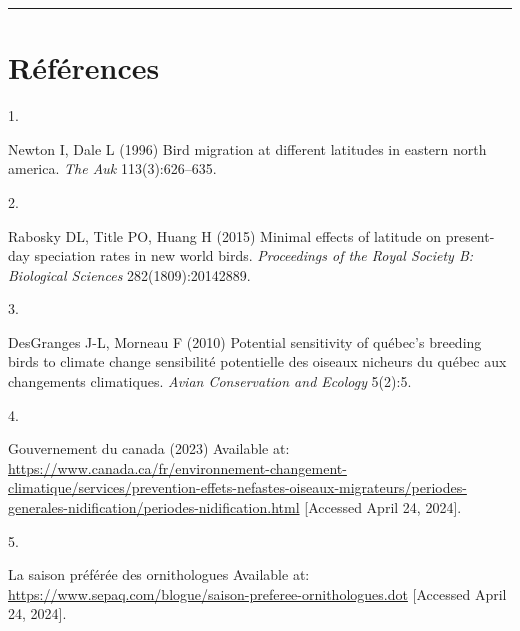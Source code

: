 \documentclass[9pt,twocolumn,twoside,]{pnas-new}
\newlength{\cslhangindent}
\newlength{\csllabelwidth}
\newlength{\cslentryspacingunit} %
\newenvironment{CSLReferences}[2] %
 {%
  \setlength{\parindent}{0pt}
  \ifodd #1
  \let\oldpar\par
  \def\par{\hangindent=\cslhangindent\oldpar}
  \fi
  \setlength{\parskip}{#2\cslentryspacingunit}
 }%
 {}
\newcommand{\CSLLeftMargin}[1]{\parbox[t]{\csllabelwidth}{#1}}
\newcommand{\CSLRightInline}[1]{\parbox[t]{\linewidth - \csllabelwidth}{#1}\break}
\begin{document}
\begin{center}\rule{0.5\linewidth}{0.5pt}\end{center}

\showmatmethods

\hypertarget{references}{%
\section*{Références}\label{references}}

\pnasbreak

\hypertarget{refs}{}
\begin{CSLReferences}{0}{0}
\leavevmode{}%
\CSLLeftMargin{1. }%
\CSLRightInline{Newton I, Dale L (1996) Bird migration at different
latitudes in eastern north america. \emph{The Auk} 113(3):626--635.}

\leavevmode{}%
\CSLLeftMargin{2. }%
\CSLRightInline{Rabosky DL, Title PO, Huang H (2015) Minimal effects of
latitude on present-day speciation rates in new world birds.
\emph{Proceedings of the Royal Society B: Biological Sciences}
282(1809):20142889.}

\leavevmode{}%
\CSLLeftMargin{3. }%
\CSLRightInline{DesGranges J-L, Morneau F (2010) Potential sensitivity
of qu{é}bec's breeding birds to climate change sensibilit{é} potentielle
des oiseaux nicheurs du qu{é}bec aux changements climatiques.
\emph{Avian Conservation and Ecology} 5(2):5.}

\leavevmode{}%
\CSLLeftMargin{4. }%
\CSLRightInline{Gouvernement du canada (2023) Available at:
\url{https://www.canada.ca/fr/environnement-changement-climatique/services/prevention-effets-nefastes-oiseaux-migrateurs/periodes-generales-nidification/periodes-nidification.html}
{[}Accessed April 24, 2024{]}.}

\leavevmode{}%
\CSLLeftMargin{5. }%
\CSLRightInline{La saison préférée des ornithologues Available at:
\url{https://www.sepaq.com/blogue/saison-preferee-ornithologues.dot}
{[}Accessed April 24, 2024{]}.}

\end{CSLReferences}



% 
\end{document}
